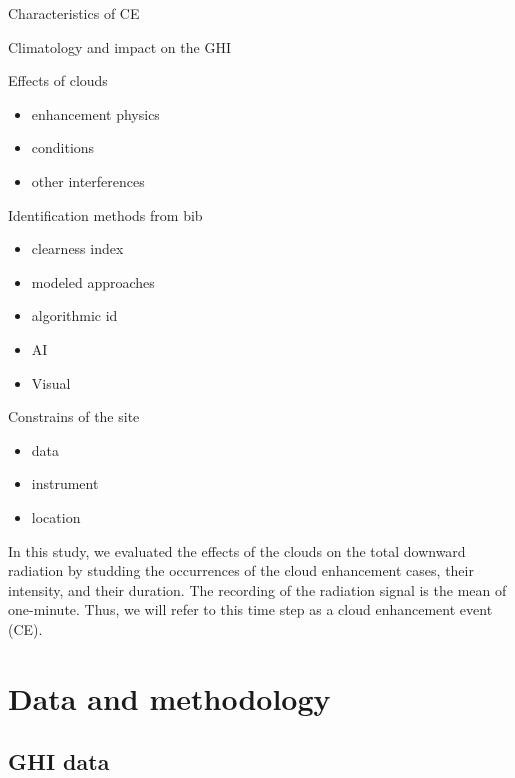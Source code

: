 \documentclass[
]{article}
\providecommand{\tightlist}{%
  \setlength{\itemsep}{0pt}\setlength{\parskip}{0pt}}
\begin{document}
Characteristics of CE

Climatology and impact on the GHI

Effects of clouds

\begin{itemize}
\tightlist
\item
  enhancement physics
\item
  conditions
\item
  other interferences
\end{itemize}

Identification methods from bib

\begin{itemize}
\tightlist
\item
  clearness index
\item
  modeled approaches
\item
  algorithmic id
\item
  AI
\item
  Visual
\end{itemize}

Constrains of the site

\begin{itemize}
\tightlist
\item
  data
\item
  instrument
\item
  location
\end{itemize}

In this study, we evaluated the effects of the clouds on the total downward radiation
by studding the occurrences of the cloud enhancement cases, their intensity, and their
duration. The recording of the radiation signal is the mean of one-minute. Thus, we
will refer to this time step as a cloud enhancement event (CE).

\hypertarget{data-and-methodology}{%
\section{Data and methodology}\label{data-and-methodology}}

\hypertarget{ghi-data}{%
\subsection{GHI data}\label{ghi-data}}
\end{document}
